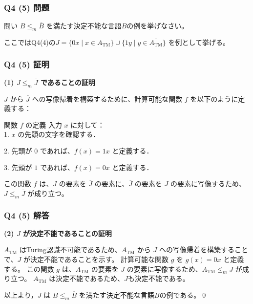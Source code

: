 \begin{frame}[fragile]
\frametitle{Q4 (5) 問題}

\begin{alertblock}{問い}
    $B \le_m \overline{B}$ を満たす決定不能な言語$B$の例を挙げなさい。
\end{alertblock}
ここではQ4(4)の$J = \{0x \mid x \in A_{\mathrm{TM}}\} \cup \{1y \mid y \in \overline{A_{\mathrm{TM}}}\}$
を例として挙げる。
\end{frame}

\begin{frame}[fragile]\frametitle{Q4 (5) 証明}
    \textbf{(1) $J \le_m \overline{J}$ であることの証明}

$J$ から $\overline{J}$ への写像帰着を構築するために、計算可能な関数 $f$ を以下のように定義する：

\begin{block}{関数 $f$ の定義}
  入力 $x$ に対して：\\

  1. $x$ の先頭の文字を確認する．

  2. 先頭が $0$ であれば、$f(x) = 1x$ と定義する．
  
  3. 先頭が $1$ であれば、$f(x) = 0x$ と定義する．
\end{block}
この関数 $f$ は、$J$ の要素を $\overline{J}$ の要素に、$\overline{J}$ の要素を $J$ の要素に写像するため、$J \le_m \overline{J}$ が成り立つ。
\end{frame}

\begin{frame}[fragile]
\frametitle{Q4 (5) 解答}

\textbf{(2) $J$ が決定不能であることの証明}

$A_{\mathrm{TM}}$ はTuring認識不可能であるため、$A_{\mathrm{TM}}$ から $J$ への写像帰着を構築することで、$J$ が決定不能であることを示す。
計算可能な関数 $g$ を $g(x) = 0x$ と定義する。
この関数 $g$ は、$A_{\mathrm{TM}}$ の要素を $J$ の要素に写像するため、$A_{\mathrm{TM}} \le_m J$ が成り立つ。
$A_{\mathrm{TM}}$ は決定不能であるため、$J$も決定不能である。

\vspace{1em}
以上より，$J$ は $B \le_m \overline{B}$ を満たす決定不能な言語$B$の例である。\qed
\end{frame}
